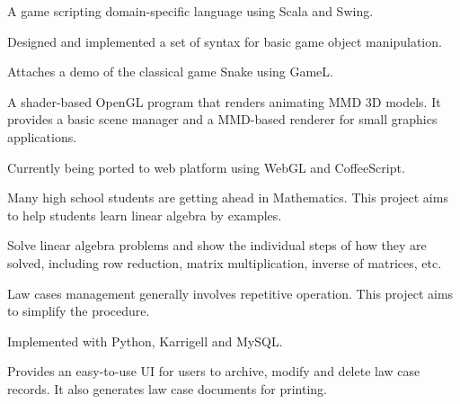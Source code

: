 \documentclass[]{deedy-resume-openfont}
\begin{document}
\begin{minipage}[t]{0.66\textwidth}
\begin{tightemize} 
\item A game scripting domain-specific language using Scala and Swing.
\item Designed and implemented a set of syntax for basic game object manipulation.
\item Attaches a demo of the classical game Snake using GameL.
\end{tightemize}
\sectionsep

\begin{tightemize} 
\item A shader-based OpenGL program that renders animating MMD 3D models. It provides a basic scene manager and a MMD-based renderer for small graphics applications.
\item Currently being ported to web platform using WebGL and CoffeeScript.
\end{tightemize}
\sectionsep

\begin{tightemize} 
\item Many high school students are getting ahead in Mathematics. This project aims to help students learn linear algebra by examples. 
\item Solve linear algebra problems and show the individual steps of how they are solved,
    including row reduction, matrix multiplication, inverse of matrices, etc.
\end{tightemize}
\sectionsep

\begin{tightemize} 
\item Law cases management generally involves repetitive operation. This project aims to simplify the procedure.
\item Implemented with Python, Karrigell and MySQL. 
\item Provides an easy-to-use UI for users to archive, modify and delete law case records. It also generates law case documents for printing.
\end{tightemize}
\sectionsep



\end{minipage}
\end{document}
